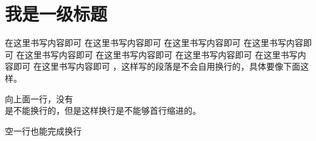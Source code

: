 \documentclass[../document.tex]{subfiles}
\begin{document}
\section{我是一级标题}
	在这里书写内容即可
	在这里书写内容即可
	在这里书写内容即可
	在这里书写内容即可
	在这里书写内容即可
	在这里书写内容即可
	在这里书写内容即可
	在这里书写内容即可
	在这里书写内容即可
	，这样写的段落是不会自用换行的，具体要像下面这样。
	
	向上面一行，没有\\是不能换行的，但是这样换行是不能够首行缩进的。
	
	空一行也能完成换行
\end{document}
